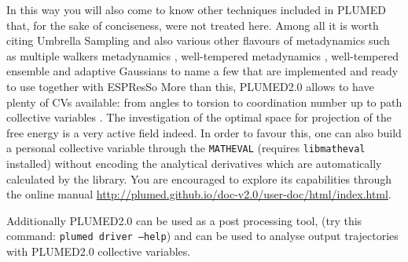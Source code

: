 \documentclass[10pt,fleqn,a4paper]{report}
\begin{document}
In this way you will also come to know other techniques included in PLUMED that, for the sake of 
conciseness, were not treated here. Among all it is worth citing
Umbrella Sampling \cite{torrie-valleau,wham1,wham2} and also various other
flavours of metadynamics such as
 multiple walkers metadynamics \cite{multiplewalkers}, well-tempered metadynamics \cite{Barducci:2008}, well-tempered ensemble\cite{Bonomi:2009p17935} and adaptive Gaussians
 \cite{Branduardi:2012dl}  to name a few that are implemented and ready to use together with ESPResSo  More than this, PLUMED2.0 allows to have plenty of CVs available: from angles to torsion to coordination number up to path collective variables \cite{brand07}. The investigation of the optimal space for projection of the free energy is a very active field indeed. In order to favour this, one can also build a personal collective variable through the \texttt{MATHEVAL} (requires \texttt{libmatheval} installed) without encoding the analytical derivatives which are automatically calculated by the library. You are encouraged to explore its capabilities through the online manual \url{http://plumed.github.io/doc-v2.0/user-doc/html/index.html}.

Additionally PLUMED2.0 can be used as a post processing tool, (try this command: \texttt{plumed driver --help}) and can be used to analyse output trajectories with PLUMED2.0 collective variables.



\printindex
\mbox{}
\newpage
\end{document}

